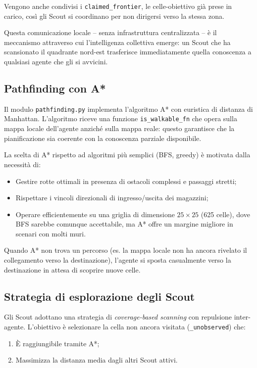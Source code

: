Vengono anche condivisi i \texttt{claimed\_frontier}, le celle-obiettivo già prese in carico, così gli Scout si coordinano per non dirigersi verso la stessa zona.

Questa comunicazione locale -- senza infrastruttura centralizzata -- è il meccanismo attraverso cui l'intelligenza collettiva emerge: un Scout che ha scansionato il quadrante nord-est trasferisce immediatamente quella conoscenza a qualsiasi agente che gli si avvicini.

\subsection{Pathfinding con A*}

Il modulo \texttt{pathfinding.py} implementa l'algoritmo A* con euristica di distanza di Manhattan. L'algoritmo riceve una funzione \texttt{is\_walkable\_fn} che opera sulla mappa locale dell'agente anziché sulla mappa reale: questo garantisce che la pianificazione sia coerente con la conoscenza parziale disponibile.

La scelta di A* rispetto ad algoritmi più semplici (BFS, greedy) è motivata dalla necessità di:
\begin{itemize}
  \item Gestire rotte ottimali in presenza di ostacoli complessi e passaggi stretti;
  \item Rispettare i vincoli direzionali di ingresso/uscita dei magazzini;
  \item Operare efficientemente su una griglia di dimensione $25 \times 25$ (625 celle), dove BFS sarebbe comunque accettabile, ma A* offre un margine migliore in scenari con molti muri.
\end{itemize}

Quando A* non trova un percorso (es. la mappa locale non ha ancora rivelato il collegamento verso la destinazione), l'agente si sposta casualmente verso la destinazione in attesa di scoprire nuove celle.

\subsection{Strategia di esplorazione degli Scout}

Gli Scout adottano una strategia di \emph{coverage-based scanning} con repulsione inter-agente. L'obiettivo è selezionare la cella non ancora visitata (\texttt{\_unobserved}) che:
\begin{enumerate}
  \item È raggiungibile tramite A*;
  \item Massimizza la distanza media dagli altri Scout attivi.
\end{enumerate}


